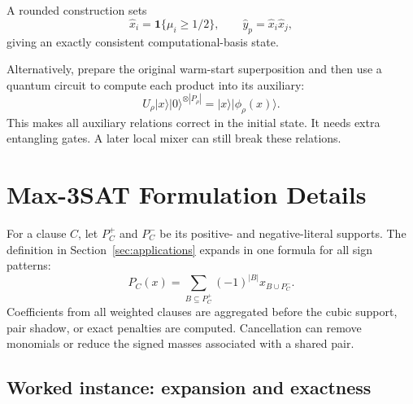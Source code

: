 \documentclass[a4paper,onecolumn,11pt,unpublished]{quantumarticle}
\theoremstyle{remark}
\begin{document}
A rounded construction sets
\[
\hat x_i=\mathbf 1\{\mu_i\ge 1/2\},
\qquad
\hat y_p=\hat x_i\hat x_j,
\]
giving an exactly consistent computational-basis state.

Alternatively, prepare the original warm-start superposition and then use
a quantum circuit to compute each product into its auxiliary:
\[
U_\rho
|x\rangle|0\rangle^{\otimes |P_\rho|}
=
|x\rangle|\phi_\rho(x)\rangle .
\]
This makes all auxiliary relations correct in the initial state. It needs
extra entangling gates. A later local mixer can still break these relations.

\section{Max-3SAT Formulation Details}
\label{app:max3sat}

For a clause \(C\), let \(P_C^+\) and \(P_C^-\) be its positive- and
negative-literal supports.  The definition in Section~\ref{sec:applications}
expands in one formula for all sign patterns:
\[
P_C(x)=\sum_{B\subseteq P_C^+}(-1)^{|B|}x_{B\cup P_C^-}.
\]
Coefficients from all weighted clauses are aggregated before the cubic
support, pair shadow, or exact penalties are computed.  Cancellation can
remove monomials or reduce the signed masses associated with a shared pair.

\subsection{Worked instance: expansion and exactness}
\label{app:max3sat-worked}
\end{document}
